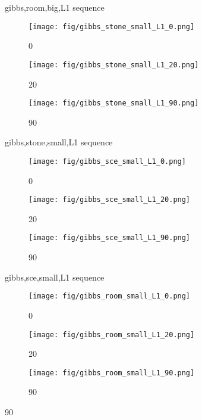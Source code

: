 \begin{figure}
  \caption{gibbs,room,big,L1 sequence}
  \label{fig:three_images}
\end{figure}\begin{figure} 
    \centering
    \begin{subfigure}[b]{0.3\textwidth}
    \texttt{[image: fig/gibbs\_stone\_small\_L1\_0.png]}
    \caption{0}
    \label{fig:image1}
  \end{subfigure}
  \hfill
  \begin{subfigure}[b]{0.3\textwidth}
    \texttt{[image: fig/gibbs\_stone\_small\_L1\_20.png]}
    \caption{20}
    \label{fig:image2}
  \end{subfigure}
  \hfill
  \begin{subfigure}[b]{0.3\textwidth}
    \texttt{[image: fig/gibbs\_stone\_small\_L1\_90.png]}
    \caption{90}
    \label{fig:image3}
  \end{subfigure}

  \caption{gibbs,stone,small,L1 sequence}
  \label{fig:three_images}
\end{figure}\begin{figure} 
    \centering
    \begin{subfigure}[b]{0.3\textwidth}
    \texttt{[image: fig/gibbs\_sce\_small\_L1\_0.png]}
    \caption{0}
    \label{fig:image1}
  \end{subfigure}
  \hfill
  \begin{subfigure}[b]{0.3\textwidth}
    \texttt{[image: fig/gibbs\_sce\_small\_L1\_20.png]}
    \caption{20}
    \label{fig:image2}
  \end{subfigure}
  \hfill
  \begin{subfigure}[b]{0.3\textwidth}
    \texttt{[image: fig/gibbs\_sce\_small\_L1\_90.png]}
    \caption{90}
    \label{fig:image3}
  \end{subfigure}

  \caption{gibbs,sce,small,L1 sequence}
  \label{fig:three_images}
\end{figure}\begin{figure} 
    \centering
    \begin{subfigure}[b]{0.3\textwidth}
    \texttt{[image: fig/gibbs\_room\_small\_L1\_0.png]}
    \caption{0}
    \label{fig:image1}
  \end{subfigure}
  \hfill
  \begin{subfigure}[b]{0.3\textwidth}
    \texttt{[image: fig/gibbs\_room\_small\_L1\_20.png]}
    \caption{20}
    \label{fig:image2}
  \end{subfigure}
  \hfill
  \begin{subfigure}[b]{0.3\textwidth}
    \texttt{[image: fig/gibbs\_room\_small\_L1\_90.png]}
    \caption{90}
    \label{fig:image3}
  \end{subfigure}


\end{figure}
